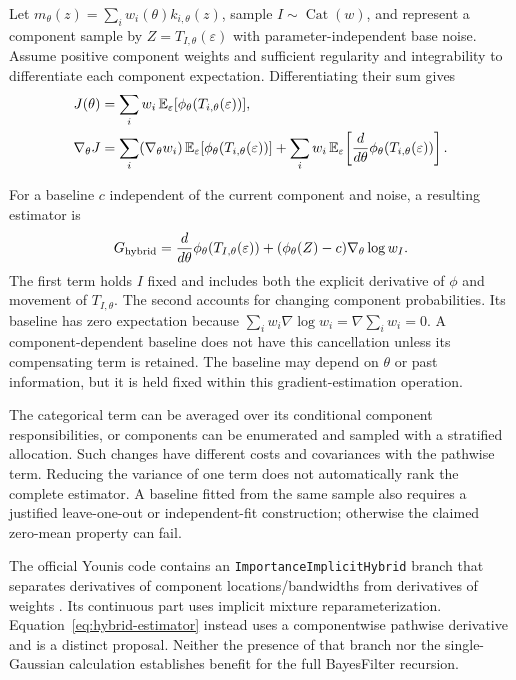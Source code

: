 \documentclass[11pt]{article}
\begin{document}
\begin{samepage}
Let $m_\theta(z)=\sum_iw_i(\theta)k_{i,\theta}(z)$, sample
$I\sim\operatorname{Cat}(w)$, and represent a component sample by
$Z=T_{I,\theta}(\varepsilon)$ with parameter-independent base noise.
Assume positive component weights and sufficient regularity and integrability
to differentiate each component expectation. Differentiating their sum gives
\begin{align}
 J(\theta)&=\sum_iw_i\,
             \mathbb E_\varepsilon[\phi_\theta(T_{i,\theta}(\varepsilon))],
 \notag\\
 \nabla_\theta J
 &=\sum_i(\nabla_\theta w_i)\,
             \mathbb E_\varepsilon[\phi_\theta(T_{i,\theta}(\varepsilon))]
   +\sum_iw_i\,
             \mathbb E_\varepsilon\!\left[
                 \frac{d}{d\theta}\phi_\theta(T_{i,\theta}(\varepsilon))
             \right].
 \label{eq:hybrid-component-derivation}
\end{align}
\end{samepage}
For a baseline $c$ independent of the current component and noise, a resulting
estimator is
\begin{equation}
 G_{\rm hybrid}
 =\frac{d}{d\theta}\phi_\theta(T_{I,\theta}(\varepsilon))
  +(\phi_\theta(Z)-c)\nabla_\theta\log w_I.
 \label{eq:hybrid-estimator}
\end{equation}
The first term holds $I$ fixed and includes both the explicit derivative of
$\phi$ and movement of $T_{I,\theta}$. The second accounts for changing
component probabilities. Its baseline has zero expectation because
$\sum_iw_i\nabla\log w_i=\nabla\sum_iw_i=0$. A component-dependent baseline
does not have this cancellation unless its compensating term is retained.
The baseline may depend on $\theta$ or past information, but it is held fixed
within this gradient-estimation operation.

The categorical term can be averaged over its conditional component
responsibilities, or components can be enumerated and sampled with a
stratified allocation. Such changes have different costs and covariances with
the pathwise term. Reducing the variance of one term does not automatically
rank the complete estimator. A baseline fitted from the same sample also
requires a justified leave-one-out or independent-fit construction; otherwise
the claimed zero-mean property can fail.

The official Younis code contains an
\texttt{ImportanceImplicitHybrid} branch that separates derivatives of
component locations/bandwidths from derivatives of weights
\citep{youniscode2023}. Its continuous part uses implicit mixture
reparameterization. Equation~\eqref{eq:hybrid-estimator} instead uses a
componentwise pathwise derivative and is a distinct proposal. Neither the
presence of that branch nor the single-Gaussian calculation establishes
benefit for the full BayesFilter recursion.
\end{document}
